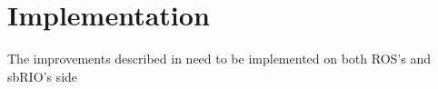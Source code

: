 \section{Implementation}
The improvements described in  need to be implemented on both ROS's and sbRIO's side 
